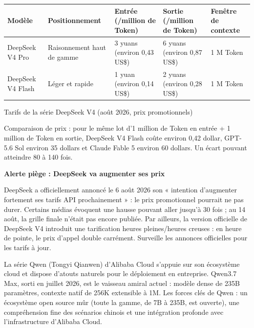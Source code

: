 \begin{center}
\begin{tabularx}{\linewidth}{|X|X|X|X|X|}
\hline
\textbf{Modèle} & \textbf{Positionnement} & \textbf{Entrée (/million de Token)} & \textbf{Sortie (/million de Token)} & \textbf{Fenêtre de contexte} \tabularnewline
\hline
DeepSeek V4 Pro & Raisonnement haut de gamme & 3 yuans (environ 0,43 US\$) & 6 yuans (environ 0,87 US\$) & 1 M Token \tabularnewline
DeepSeek V4 Flash & Léger et rapide & 1 yuan (environ 0,14 US\$) & 2 yuans (environ 0,28 US\$) & 1 M Token \tabularnewline
\hline
\end{tabularx}
\end{center}

\begin{center}\small\color{gray}Tarifs de la série DeepSeek V4 (août 2026, prix promotionnels)\end{center}

Comparaison de prix : pour le même lot d'1 million de Token en entrée + 1 million de Token en sortie, DeepSeek V4 Flash coûte environ 0,42 dollar, GPT-5.6 Sol environ 35 dollars et Claude Fable 5 environ 60 dollars. Un écart pouvant atteindre 80 à 140 fois.

\textbf{Alerte piège : DeepSeek va augmenter ses prix}\par

DeepSeek a officiellement annoncé le 6 août 2026 son « intention d'augmenter fortement ses tarifs API prochainement » : le prix promotionnel pourrait ne pas durer. Certains médias évoquent une hausse pouvant aller jusqu'à 30 fois ; au 14 août, la grille finale n'était pas encore publiée. Par ailleurs, la version officielle de DeepSeek V4 introduit une tarification heures pleines/heures creuses : en heure de pointe, le prix d'appel double carrément. Surveille les annonces officielles pour les tarifs à jour.


La série Qwen (Tongyi Qianwen) d'Alibaba Cloud s'appuie sur son écosystème cloud et dispose d'atouts naturels pour le déploiement en entreprise. Qwen3.7 Max, sorti en juillet 2026, est le vaisseau amiral actuel : modèle dense de 235B paramètres, contexte natif de 256K extensible à 1M. Les forces clés de Qwen : un écosystème open source mûr (toute la gamme, de 7B à 235B, est ouverte), une compréhension fine des scénarios chinois et une intégration profonde avec l'infrastructure d'Alibaba Cloud.

